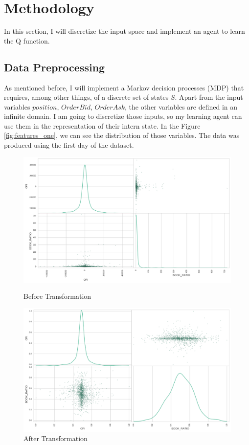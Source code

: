 \documentclass[a4paper]{article}
\begin{document}

\section{Methodology}
\label{sec:methodology}

In this section, I will discretize the input space and implement an agent to learn the Q function.

\subsection{Data Preprocessing}
As mentioned before, I will implement a Markov decision processes (MDP) that requires, among other things, of a discrete set of states $S$. Apart from the input variables $position$, $OrderBid$, $OrderAsk$, the other variables are defined in an infinite domain. I am going to discretize those inputs, so my learning agent can use them in the representation of their intern state. In the Figure \ref{fig:features_one}, we can see the distribution of those variables. The data was produced using the first day of the dataset.


\begin{figure}[ht!]
  \includegraphics[width=\linewidth]{figures/scatter_feat_1.png}
  \caption{\label{fig:features_one}Before Transformation}
\endminipage
{}
  \includegraphics[width=\linewidth]{figures/scatter_feat_2.png}
  \caption{\label{fig:features_two}After Transformation}
\endminipage
\end{figure}
\end{document}
